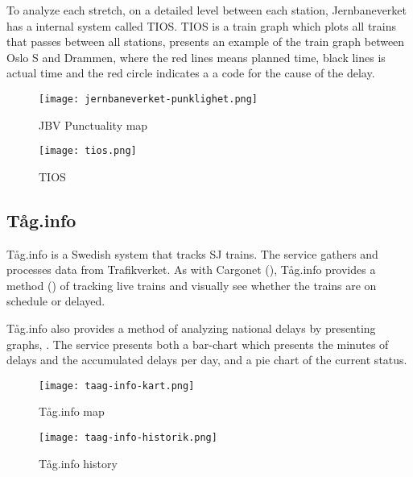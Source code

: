 To analyze each stretch, on a detailed level between each station,
Jernbaneverket has a internal system called TIOS.
TIOS is a train graph which plots all trains that passes between all stations,
 presents an example of the train graph between Oslo S and Drammen, where the red lines means planned
time, black lines is actual time and the red circle indicates a a code for the cause of the delay. 

\begin{figure}[!htbp]
	\texttt{[image: jernbaneverket-punklighet.png]}
	\caption[JBV Punctuality map]{JBV Punctuality map \cite{jernbaneverketPunklighetKart}}
	\label{fig:jernbaneverket-punklighet}
\end{figure}
\begin{figure}[!htbp]
	\texttt{[image: tios.png]}
	\caption[TIOS]{TIOS\cite{jernbaneverketAbout}}
	\label{fig:jernbaneverket-tios}
\end{figure}

\subsection{Tåg.info}
\label{sub:subsection_taag.info}

Tåg.info\cite{taagInfo} is a Swedish system that tracks SJ\cite{svenskaJernban}
trains. The service gathers and processes data from Trafikverket\cite{trafikverket}. As with Cargonet (),
Tåg.info provides a method () of tracking live trains and visually see whether the trains are on schedule or delayed. 

Tåg.info also provides a method of analyzing national delays by presenting
graphs, . The service presents both a bar-chart
which presents the minutes of delays and the accumulated delays per day, and a
pie chart of the current status.

\begin{figure}[!htbp]
	\texttt{[image: taag-info-kart.png]}
	\caption[Tåg.info map]{Tåg.info map
	\cite{taagInfo}}
	\label{fig:taag-info-kart}
\end{figure}

\begin{figure}[!htbp]
	\texttt{[image: taag-info-historik.png]}
	\caption[Tåg.info history]{Tåg.info history
	\cite{taagInfo}}
	\label{fig:taag-info-historik}
\end{figure}


